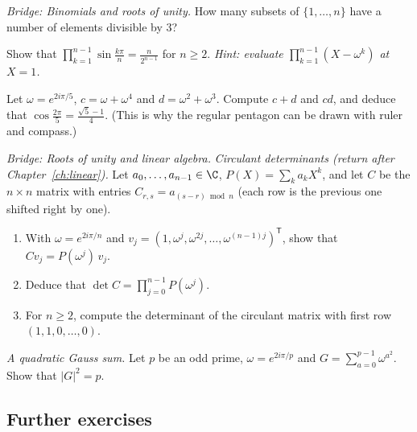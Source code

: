 \begin{exercise}[$\star\star$]\label{ex:mod3}
\emph{Bridge: Binomials and roots of unity.}
How many subsets of $\{1,\dots,n\}$ have a number of elements divisible by $3$?
\end{exercise}

\begin{exercise}[$\star\star$]\label{ex:sines}
Show that $\displaystyle\prod_{k=1}^{n-1}\sin\frac{k\pi}n=\frac n{2^{n-1}}$ for $n\ge2$.
\emph{Hint: evaluate $\prod_{k=1}^{n-1}(X-\omega^k)$ at $X=1$.}
\end{exercise}

\begin{exercise}[$\star\star$]\label{ex:pentagon}
Let $\omega=e^{2i\pi/5}$, $c=\omega+\omega^4$ and $d=\omega^2+\omega^3$. Compute $c+d$ and $cd$, and deduce that
$\cos\frac{2\pi}5=\frac{\sqrt5-1}4$. (This is why the regular pentagon can be drawn with ruler and compass.)
\end{exercise}

\begin{exercise}[$\star\star\star$]\label{ex:circulant}
\emph{Bridge: Roots of unity and linear algebra.}
\emph{Circulant determinants (return after Chapter~\ref{ch:linear}).} Let $a_0,\dots,a_{n-1}\in\C$, $P(X)=\sum_ka_kX^k$, and let $C$ be the $n\times n$ matrix
with entries $C_{r,s}=a_{(s-r)\bmod n}$ (each row is the previous one shifted right by one).
\begin{enumerate}[label=(\alph*)]
\item With $\omega=e^{2i\pi/n}$ and $v_j=\left(1,\omega^j,\omega^{2j},\dots,\omega^{(n-1)j}\right)^{\mathsf T}$, show that $Cv_j=P(\omega^j)\,v_j$.
\item Deduce that $\det C=\prod_{j=0}^{n-1}P(\omega^j)$.
\item For $n\ge2$, compute the determinant of the circulant matrix with first row $(1,1,0,\dots,0)$.
\end{enumerate}
\end{exercise}

\begin{exercise}[$\star\star\star$]\label{ex:gauss}
\emph{A quadratic Gauss sum.} Let $p$ be an odd prime, $\omega=e^{2i\pi/p}$ and $G=\sum_{a=0}^{p-1}\omega^{a^2}$. Show that $|G|^2=p$.
\end{exercise}

\subsection*{Further exercises}

